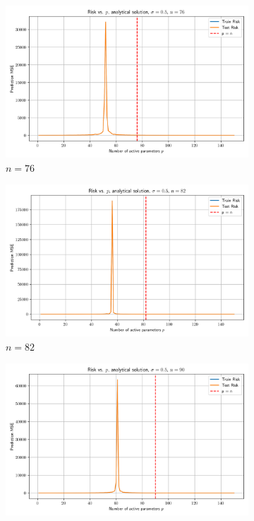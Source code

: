 \documentclass{article}
\begin{document}
\begin{figure}[htb]
  \begin{subfigure}[b]{\imgwidth}
    \includegraphics[width=\linewidth]{img2/risk_curve_n76.png}
    \caption{$n=76$}\label{fig:2e}
  \end{subfigure}%
  \hfill
  \begin{subfigure}[b]{\imgwidth}
    \includegraphics[width=\linewidth]{img2/risk_curve_n82.png}
    \caption{$n=82$}\label{fig:2f}
  \end{subfigure}%
  \hfill
  \begin{subfigure}[b]{\imgwidth}
    \includegraphics[width=\linewidth]{img2/risk_curve_n90.png}

\end{subfigure}
\end{figure}
\end{document}
